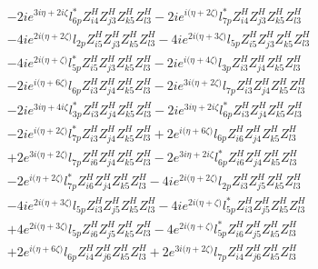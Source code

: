 \begin{align}
 &-2 i e^{3 i \eta +2 i \zeta } l_{6p}^* Z_{{i 4}}^{H} Z_{{j 3}}^{H} Z_{{k 5}}^{H} Z_{{l 3}}^{H} -2 i e^{i \Big(\eta +2 \zeta \Big)} l_{7p}^* Z_{{i 4}}^{H} Z_{{j 3}}^{H} Z_{{k 5}}^{H} Z_{{l 3}}^{H} \nonumber \\ 
 &-4 i e^{2 i \Big(\eta +2 \zeta \Big)} l_{2p} Z_{{i 5}}^{H} Z_{{j 3}}^{H} Z_{{k 5}}^{H} Z_{{l 3}}^{H} -4 i e^{2 i \Big(\eta +3 \zeta \Big)} l_{5p} Z_{{i 5}}^{H} Z_{{j 3}}^{H} Z_{{k 5}}^{H} Z_{{l 3}}^{H} \nonumber \\ 
 &-4 i e^{2 i \Big(\eta +\zeta \Big)} l_{5p}^* Z_{{i 5}}^{H} Z_{{j 3}}^{H} Z_{{k 5}}^{H} Z_{{l 3}}^{H} -2 i e^{i \Big(\eta +4 \zeta \Big)} l_{3p} Z_{{i 3}}^{H} Z_{{j 4}}^{H} Z_{{k 5}}^{H} Z_{{l 3}}^{H} \nonumber \\ 
 &-2 i e^{i \Big(\eta +6 \zeta \Big)} l_{6p} Z_{{i 3}}^{H} Z_{{j 4}}^{H} Z_{{k 5}}^{H} Z_{{l 3}}^{H} -2 i e^{3 i \Big(\eta +2 \zeta \Big)} l_{7p} Z_{{i 3}}^{H} Z_{{j 4}}^{H} Z_{{k 5}}^{H} Z_{{l 3}}^{H} \nonumber \\ 
 &-2 i e^{3 i \eta +4 i \zeta } l_{3p}^* Z_{{i 3}}^{H} Z_{{j 4}}^{H} Z_{{k 5}}^{H} Z_{{l 3}}^{H} -2 i e^{3 i \eta +2 i \zeta } l_{6p}^* Z_{{i 3}}^{H} Z_{{j 4}}^{H} Z_{{k 5}}^{H} Z_{{l 3}}^{H} \nonumber \\ 
 &-2 i e^{i \Big(\eta +2 \zeta \Big)} l_{7p}^* Z_{{i 3}}^{H} Z_{{j 4}}^{H} Z_{{k 5}}^{H} Z_{{l 3}}^{H} +2 e^{i \Big(\eta +6 \zeta \Big)} l_{6p} Z_{{i 6}}^{H} Z_{{j 4}}^{H} Z_{{k 5}}^{H} Z_{{l 3}}^{H} \nonumber \\ 
 &+2 e^{3 i \Big(\eta +2 \zeta \Big)} l_{7p} Z_{{i 6}}^{H} Z_{{j 4}}^{H} Z_{{k 5}}^{H} Z_{{l 3}}^{H} -2 e^{3 i \eta +2 i \zeta } l_{6p}^* Z_{{i 6}}^{H} Z_{{j 4}}^{H} Z_{{k 5}}^{H} Z_{{l 3}}^{H} \nonumber \\ 
 &-2 e^{i \Big(\eta +2 \zeta \Big)} l_{7p}^* Z_{{i 6}}^{H} Z_{{j 4}}^{H} Z_{{k 5}}^{H} Z_{{l 3}}^{H} -4 i e^{2 i \Big(\eta +2 \zeta \Big)} l_{2p} Z_{{i 3}}^{H} Z_{{j 5}}^{H} Z_{{k 5}}^{H} Z_{{l 3}}^{H} \nonumber \\ 
 &-4 i e^{2 i \Big(\eta +3 \zeta \Big)} l_{5p} Z_{{i 3}}^{H} Z_{{j 5}}^{H} Z_{{k 5}}^{H} Z_{{l 3}}^{H} -4 i e^{2 i \Big(\eta +\zeta \Big)} l_{5p}^* Z_{{i 3}}^{H} Z_{{j 5}}^{H} Z_{{k 5}}^{H} Z_{{l 3}}^{H} \nonumber \\ 
 &+4 e^{2 i \Big(\eta +3 \zeta \Big)} l_{5p} Z_{{i 6}}^{H} Z_{{j 5}}^{H} Z_{{k 5}}^{H} Z_{{l 3}}^{H} -4 e^{2 i \Big(\eta +\zeta \Big)} l_{5p}^* Z_{{i 6}}^{H} Z_{{j 5}}^{H} Z_{{k 5}}^{H} Z_{{l 3}}^{H} \nonumber \\ 
 &+2 e^{i \Big(\eta +6 \zeta \Big)} l_{6p} Z_{{i 4}}^{H} Z_{{j 6}}^{H} Z_{{k 5}}^{H} Z_{{l 3}}^{H} +2 e^{3 i \Big(\eta +2 \zeta \Big)} l_{7p} Z_{{i 4}}^{H} Z_{{j 6}}^{H} Z_{{k 5}}^{H} Z_{{l 3}}^{H} \nonumber \\ 

\end{align}
